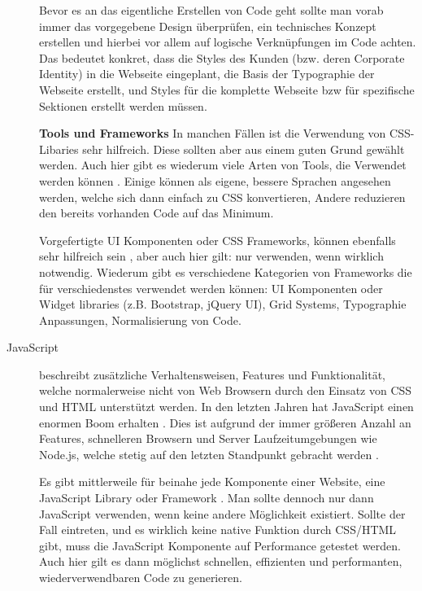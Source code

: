 \begin{description}
Bevor es an das eigentliche Erstellen von Code geht sollte man vorab immer das vorgegebene Design überprüfen, ein technisches Konzept erstellen und hierbei vor allem auf logische Verknüpfungen im Code achten. Das bedeutet konkret, dass die Styles des Kunden (bzw. deren Corporate Identity) in die Webseite eingeplant, die Basis der Typographie der Webseite erstellt, und Styles für die komplette Webseite bzw für spezifische Sektionen erstellt werden müssen.

\textbf{Tools und Frameworks\newline}
In manchen Fällen ist die Verwendung von CSS-Libaries sehr hilfreich. Diese sollten aber aus einem guten Grund gewählt werden. Auch hier gibt es wiederum viele Arten von Tools, die Verwendet werden können \cite{MELD.CH3-web-app.css3}. Einige können als eigene, bessere Sprachen angesehen werden, welche sich dann einfach zu CSS konvertieren, Andere reduzieren den bereits vorhanden Code auf das Minimum.

Vorgefertigte UI Komponenten oder CSS Frameworks, können ebenfalls sehr hilfreich sein \cite{MELD.CH3-web-app.css3}, aber auch hier gilt: nur verwenden, wenn wirklich notwendig. Wiederum gibt es verschiedene Kategorien von Frameworks die für verschiedenstes verwendet werden können: UI Komponenten oder Widget libraries (z.B. Bootstrap, jQuery UI), Grid Systems, Typographie Anpassungen, Normalisierung von Code.


\item[JavaScript\newline]
beschreibt zusätzliche Verhaltensweisen, Features und Funktionalität, welche normalerweise nicht von Web Browsern durch den Einsatz von CSS und HTML unterstützt werden. In den letzten Jahren hat JavaScript einen enormen Boom erhalten \cite{MELD.CH3-web-app.js2}. Dies ist aufgrund der immer größeren Anzahl an Features, schnelleren Browsern und Server Laufzeitumgebungen wie Node.js, welche stetig auf den letzten Standpunkt gebracht werden \cite{MELD.CH3-web-app.js1}. 

Es gibt mittlerweile für beinahe jede Komponente einer Website, eine JavaScript Library oder Framework \cite{MELD.CH3-web-app.js3}. Man sollte dennoch nur dann JavaScript verwenden, wenn keine andere Möglichkeit existiert.  Sollte der Fall eintreten, und es wirklich keine native Funktion durch CSS/HTML gibt, muss die JavaScript Komponente auf Performance getestet werden. Auch hier gilt es dann möglichst schnellen, effizienten und performanten, wiederverwendbaren Code zu generieren. 


\end{description}

